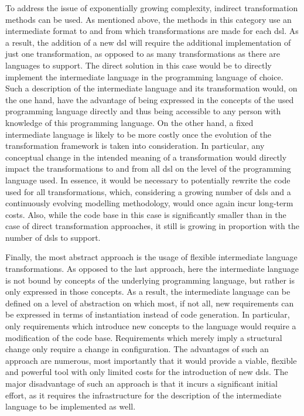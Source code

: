 To address the issue of exponentially growing complexity, indirect transformation methods can be used. As mentioned above, the methods in this category use an intermediate format to and from which transformations are made for each \gls{dsl}. As a result, the addition of a new \gls{dsl} will require the additional implementation of just one transformation, as opposed to as many transformations as there are languages to support. The direct solution in this case would be to directly implement the intermediate language in the programming language of choice. Such a description of the intermediate language and its transformation would, on the one hand, have the advantage of being expressed in the concepts of the used programming language directly and thus being accessible to any person with knowledge of this programming language. On the other hand, a fixed intermediate language is likely to be more costly once the evolution of the transformation framework is taken into consideration. In particular, any conceptual change in the intended meaning of a transformation would directly impact the transformations to and from all \gls{dsl} on the level of the programming language used. In essence, it would be necessary to potentially rewrite the code used for all transformations, which, considering a growing number of \glspl{dsl} and a continuously evolving modelling methodology, would once again incur long-term costs. Also, while the code base in this case is significantly smaller than in the case of direct transformation approaches, it still is growing in proportion with the number of \glspl{dsl} to support.

Finally, the most abstract approach is the usage of flexible intermediate language transformations. As opposed to the last approach, here the intermediate language is not bound by concepts of the underlying programming language, but rather is only expressed in those concepts. As a result, the intermediate language can be defined on a level of abstraction on which most, if not all, new requirements can be expressed in terms of instantiation instead of code generation. In particular, only requirements which introduce new concepts to the language would require a modification of the code base. Requirements which merely imply a structural change only require a change in configuration. The advantages of such an approach are numerous, most importantly that it would provide a viable, flexible and powerful tool with only limited costs for the introduction of new \glspl{dsl}. The major disadvantage of such an approach is that it incurs a significant initial effort, as it requires the infrastructure for the description of the intermediate language to be implemented as well.

